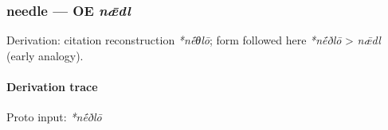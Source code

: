 \documentclass[
  british,
  a4paper,
]{article}
\begin{document}
\subsubsection{\texorpdfstring{needle --- OE
\emph{nǣdl}}{needle --- OE nǣdl}}\label{needle-oe-nux1e3dl}

Derivation: citation reconstruction \emph{*nḗθlō}; form followed here
\emph{*nḗðlō} \textgreater{} \emph{nǣdl} (early analogy).

\paragraph{Derivation trace}\label{derivation-trace-129}

Proto input: \emph{*nḗðlō}

\begingroup
\setlength{\fboxsep}{6pt}
\end{document}
